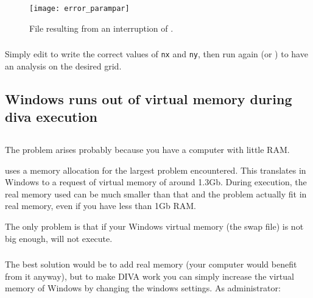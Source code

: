 \begin{figure}[htpb]
\centering
\texttt{[image: error\_parampar]}
\caption{File  resulting from an interruption of .\label{fig:errorparampar}}
\end{figure}

\subsubsection{\answer}


Simply edit  to write the correct values of \texttt{nx} and \texttt{ny}, then run again  (or ) to have an analysis on the desired grid.






\subsection{Windows runs out of virtual memory during diva execution}




\subsection{\question}

The problem arises probably because you have a computer with little RAM.

\diva uses a memory allocation for the largest problem encountered. This 
translates in Windows to a request of virtual memory of around 1.3Gb.
During execution, the real memory used can be much smaller than that and 
the problem actually fit in real memory, even if you have less than 1Gb RAM.

The only problem is that if your Windows virtual memory (the swap file) 
is not big enough, \diva will not execute.


\subsubsection{\answer}

The best solution would be to 
add real memory (your computer would benefit from it anyway), but to 
make DIVA work you can simply increase the virtual memory of Windows by 
changing the windows settings. As administrator:\\


